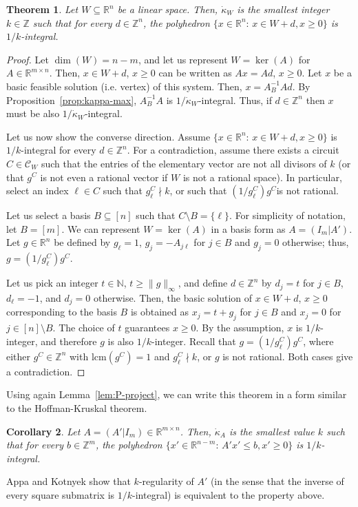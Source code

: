 \documentclass[11pt, a4paper]{article}
\newcommand{\circuits}{\mathcal{C}}
\newcommand{\1}{\mathbbm{1}}
\newcommand{\kd}{{\dot{\kappa}}}
\newcommand{\lcm}{\mathrm{lcm}}
\newtheorem{theorem}{Theorem}[section]
\newtheorem{cor}[theorem]{Corollary}
\theoremstyle{case}
\newcommand{\R}{\mathbb{R}}
\newcommand{\Z}{\mathbb{Z}}
\newcommand{\N}{\mathbb{N}}
\begin{document}
\begin{theorem}\label{thm:kappa-HK}
Let $W\subseteq\R^n$ be a linear space. Then, $\dot\kappa_W$ is the smallest integer $k\in\Z$ such that for every $d\in \Z^n$,
the polyhedron $\{x\in\R^n:\, x\in W+d, x\ge 0\}$ is $1/k$-integral.
\end{theorem}
\begin{proof}  Let $\dim(W)=n-m$, and let us represent $W=\ker(A)$ for $A\in\R^{m\times n}$. Then, $x\in W+d$, $x\ge 0$ can be written as $Ax=Ad$, $x\ge 0$. 
Let $x$ be a basic feasible solution (i.e. vertex) of this system. Then, $x=A_B^{-1}Ad$. By Proposition~\ref{prop:kappa-max}, $A_B^{-1}A$ is $1/\kd_W$-integral. Thus, if $d\in \Z^n$ then $x$ must be also $1/\kd_W$-integral.

Let us now show the converse direction. Assume $\{x\in\R^n:\, x\in W+d, x\ge 0\}$ is $1/k$-integral for every $d\in\Z^n$. For a contradiction, assume there exists a circuit $C\in\circuits_W$ such that the entries of the elementary vector  are not all divisors of $k$ (or that $g^C$ is not even a rational vector if $W$ is not a rational space). In particular, select an index $\ell\in C$ such that $g^C_\ell\nmid k$, or such that $(1/g^C_\ell)g^C$is not rational.

 Let us select a basis $B\subseteq [n]$ such that $C\setminus B=\{\ell\}$. For simplicity of notation, let $B=[m]$. We can represent $W=\ker(A)$ in a basis form as $A=(I_m|A')$. Let $g\in\R^n$ be defined by $g_{\ell}=1$, $g_j=-A_{j\ell}$ for $j\in B$ and $g_j=0$ otherwise; thus, $g=(1/g^C_\ell)g^C$. 

Let us pick an integer $t\in\N$, $t\ge \|g\|_\infty$, and define $d\in\Z^n$ by $d_j=t$ for $j\in B$, $d_\ell=-1$, and $d_j=0$ otherwise. Then, the basic solution of $x\in W+d$, $x\ge 0$ corresponding to the basis $B$ is obtained as $x_j=t+g_j$ for $j\in B$ and $x_j=0$ for $j\in [n]\setminus B$. The choice of $t$ guarantees  $x\ge 0$. By the assumption, $x$ is $1/k$-integer, and therefore $g$ is also $1/k$-integer. Recall that $g=(1/g^C_\ell)g^C$, where either $g^C\in\Z^n$ with $\lcm(g^C)=1$ and $g^C_\ell\nmid k$, or $g$ is not rational. Both cases give a contradiction.
\end{proof}

Using again Lemma~\ref{lem:P-project}, we can write this theorem in a form similar to the Hoffman-Kruskal theorem. 

\begin{cor}\label{cor:HK-kappa}
Let $A=(A'|I_m)\in\R^{m\times n}$. Then, $\kd_A$ is the smallest value $k$ such that for 
 every $b\in\Z^m$, the polyhedron $\{x'\in \R^{n-m}:\, A'x'\le b,x'\ge 0\}$
 is $1/k$-integral.
\end{cor} 
Appa and Kotnyek \cite[Theorem 17]{Appa04} show that $k$-regularity of $A'$ (in the sense that the inverse of every square submatrix is $1/k$-integral) is equivalent to the property above. 
\end{document}
